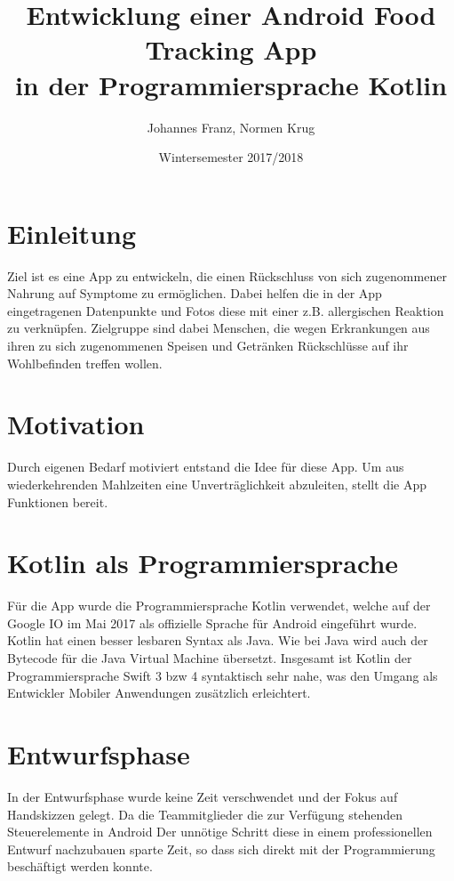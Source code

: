 \documentclass[
    DIV12,
    cleardouble=plain,
    headings=normal,
    pdftex,
    headexclude,footexclude,
    final
]{scrreprt}
\title{
  Entwicklung einer Android Food Tracking App \\[1em]
  in der Programmiersprache Kotlin  
}
\author{Johannes Franz, Normen Krug}
\date{Wintersemester 2017/2018}
\begin{document}
\maketitle



\tableofcontents


\newpage
{}


\chapter{Einleitung}
Ziel ist es eine App zu entwickeln, die einen Rückschluss von sich zugenommener Nahrung auf Symptome zu ermöglichen. Dabei helfen die in der App eingetragenen Datenpunkte und Fotos diese mit einer z.B. allergischen Reaktion zu verknüpfen.
Zielgruppe sind dabei Menschen, die wegen Erkrankungen aus ihren zu sich zugenommenen Speisen und Getränken Rückschlüsse auf ihr Wohlbefinden treffen wollen.


\newpage

\chapter{Motivation}
Durch eigenen Bedarf motiviert entstand die Idee für diese App. Um aus wiederkehrenden Mahlzeiten eine Unverträglichkeit abzuleiten, stellt die App Funktionen bereit.



\chapter{Kotlin als Programmiersprache}
Für die App wurde die Programmiersprache Kotlin verwendet, welche auf der Google IO im Mai 2017 als offizielle Sprache für Android eingeführt wurde. Kotlin hat einen besser lesbaren Syntax als Java. Wie bei Java wird auch der Bytecode für die Java Virtual Machine übersetzt. Insgesamt ist Kotlin der Programmiersprache Swift 3 bzw 4 syntaktisch sehr nahe, was den Umgang als Entwickler Mobiler Anwendungen zusätzlich erleichtert.




\newpage

\chapter{Entwurfsphase}
In der Entwurfsphase wurde keine Zeit verschwendet und der Fokus auf Handskizzen gelegt. Da die Teammitglieder die zur Verfügung stehenden Steuerelemente in Android  Der unnötige Schritt diese in einem professionellen Entwurf nachzubauen sparte Zeit, so dass sich direkt mit der Programmierung beschäftigt werden konnte.
\end{document}
